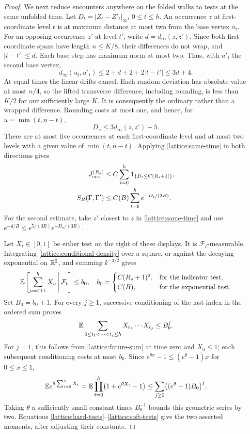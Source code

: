 \begin{proof}
We next reduce encounters anywhere on the folded walks to tests at the
same unfolded time.  Let $D_t=|Z_t-Z'_t|_\infty$, $0\le t\le h$.
An occurrence $z$ at first-coordinate level $t$ is at maximum distance
at most two from the base vertex $u_t$.  For an opposing occurrence
$z'$ at level $t'$, write $d=d_\infty(z,z')$.  Since both first-coordinate
spans have length $n\le K/8$, their differences do not wrap, and
$|t-t'|\le d$.  Each base step has maximum norm at most two.  Thus,
with $u'_t$ the second base vertex,
\[
 d_\infty(u_t,u'_t)\le 2+d+2+2|t-t'|\le3d+4.
\]
At equal times the linear drifts cancel.  Each random deviation has
absolute value at most $n/4$, so the lifted transverse difference,
including rounding, is less than $K/2$ for our sufficiently large $K$.
It is consequently the ordinary rather than a wrapped difference.
Rounding costs at most one, and hence, for $u=\min(t,n-t)$,
\begin{equation}\label{lattice:same-time}
                 D_u\le3d_\infty(z,z')+5.
\end{equation}
There are at most five occurrences at each first-coordinate level and
at most two levels with a given value of $\min(t,n-t)$.  Applying
\eqref{lattice:same-time} in both directions gives
\begin{align}
 J_{\rm occ}^{(R_s)}
 &\le C\sum_{t=0}^{h}\mathbf 1_{\{D_t\le C(R_s+1)\}},
                                      \label{lattice:hard-tests}\\
 S_B(\Gamma,\Gamma')
 &\le C(B)\sum_{t=0}^{h}e^{-D_t/(3B)}.
                                      \label{lattice:soft-tests}
\end{align}
For the second estimate, take $z'$ closest to $z$ in
\eqref{lattice:same-time} and use
$e^{-d/B}\le e^{5/(3B)}e^{-D_u/(3B)}$.

Let $X_t\in[0,1]$ be either test on the right of these displays.
It is $\mathcal F_t$-measurable.  Integrating
\eqref{lattice:conditional-density} over a square, or against the
decaying exponential on $\mathbb R^2$, and summing $k^{-3/2}$ gives
\begin{equation}\label{lattice:future-sum}
 \mathbb E\left[\sum_{u=t+1}^hX_u\,\middle|\,\mathcal F_t\right]\le b_0,
 \quad
 b_0=\begin{cases}
 C(R_s+1)^2,&\text{for the indicator test},\\
 C(B),&\text{for the exponential test}.
 \end{cases}
\end{equation}
Set $B_0=b_0+1$.  For every $j\ge1$, successive conditioning of
the last index in the ordered sum proves
\[
 \mathbb E\sum_{0\le t_1<\cdots<t_j\le h}X_{t_1}\cdots X_{t_j}
 \le B_0^j.
\]
For $j=1$, this follows from \eqref{lattice:future-sum} at time zero
and $X_0\le1$; each subsequent conditioning costs at most $b_0$.
Since $e^{\theta x}-1\le(e^\theta-1)x$ for $0\le x\le1$,
\[
 \mathbb E e^{\theta\sum_{t=0}^hX_t}
 =\mathbb E\prod_{t=0}^h\bigl(1+e^{\theta X_t}-1\bigr)
 \le\sum_{j\ge0}\bigl((e^\theta-1)B_0\bigr)^j.
\]
Taking $\theta$ a sufficiently small constant times $B_0^{-1}$
bounds this geometric series by two.  Equations
\eqref{lattice:hard-tests}--\eqref{lattice:soft-tests} give the two
asserted moments, after adjusting their constants.
\end{proof}

